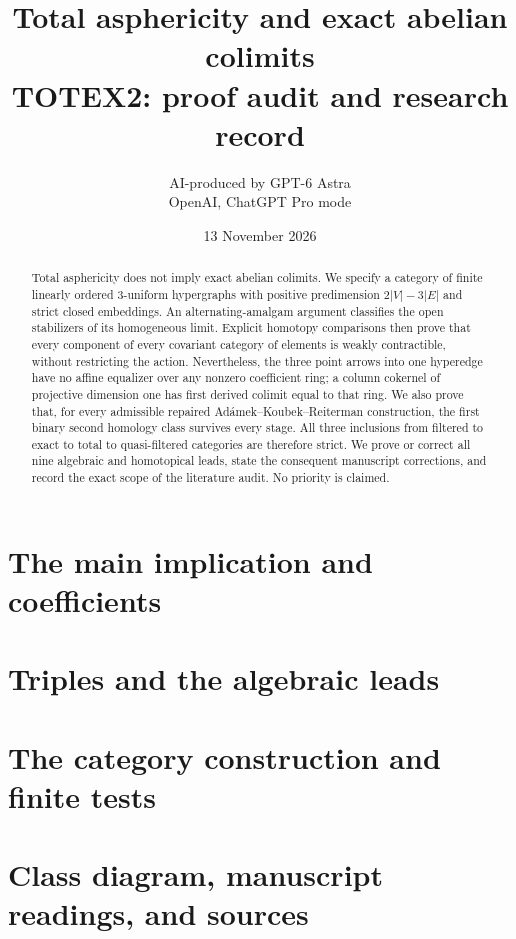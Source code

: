 \documentclass[11pt,a4paper]{article}
\title{Total asphericity and exact abelian colimits\\\large TOTEX2: proof audit and research record}
\author{AI-produced by GPT-6 Astra\\OpenAI, ChatGPT Pro mode}
\date{13 November 2026}
\theoremstyle{definition}
\begin{document}
\maketitle
\begin{abstract}
Total asphericity does not imply exact abelian colimits. We specify
a category of finite linearly ordered $3$-uniform hypergraphs with
positive predimension $2|V|-3|E|$ and strict closed embeddings.
An alternating-amalgam argument classifies the open stabilizers of
its homogeneous limit. Explicit homotopy comparisons then prove
that every component of every covariant category of elements is
weakly contractible, without restricting the action. Nevertheless,
the three point arrows into one hyperedge have no affine equalizer
over any nonzero coefficient ring; a column cokernel of projective
dimension one has first derived colimit equal to that ring.
We also prove that, for every admissible repaired
Ad\'amek--Koubek--Reiterman construction, the first binary second
homology class survives every stage. All three inclusions from
filtered to exact to total to quasi-filtered categories are therefore
strict. We prove or correct all nine algebraic and homotopical leads,
state the consequent manuscript corrections, and record the exact
scope of the literature audit. No priority is claimed.
\end{abstract}
\tableofcontents
\section{The main implication and coefficients}













\section{Triples and the algebraic leads}


\section{The category construction and finite tests}
















\section{Class diagram, manuscript readings, and sources}

\nocite{*}


\end{document}
